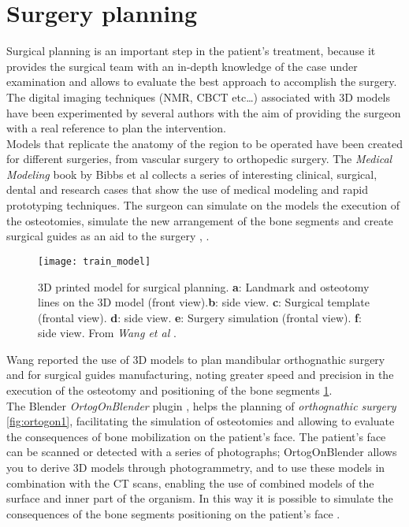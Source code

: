 \section{Surgery planning}
Surgical planning is an important step in the patient's treatment, because it provides the surgical team with an in-depth knowledge of the case under examination and allows to evaluate the best approach to accomplish the surgery. The digital imaging techniques (NMR, CBCT etc\ldots) associated with 3D models have been experimented by several authors with the aim of providing the surgeon with a real reference to plan the intervention. \\ Models that replicate the anatomy of the region to be operated have been created for different surgeries, from vascular surgery to orthopedic surgery. The \emph{Medical Modeling} book by Bibbs et al \parencite{Reference1} collects a series of interesting clinical, surgical, dental and research cases that show the use of medical modeling and rapid prototyping techniques. The surgeon can simulate on the models the execution of the osteotomies, simulate the new arrangement of the bone segments and create surgical guides as an aid to the surgery \parencite{Reference77}, \parencite{Reference78}.
\begin{figure}[h]
\vspace{-10pt}
	\begin{center}
	\texttt{[image: train\_model]}
    \caption{3D printed model for surgical planning.
\textbf{a}: Landmark and osteotomy lines on the 3D model (front view).\textbf{b}: side view. \textbf{c}: Surgical template (frontal view). \textbf{d}: side view. \textbf{e}: Surgery simulation (frontal view). \textbf{f}: side view. From \emph{Wang et al} \parencite{Reference20}.}
    \label{fig:train_model}
    \end{center}
\vspace{-20pt}
\end{figure}

Wang \parencite{Reference109} reported the use of 3D models to plan mandibular orthognathic surgery and for surgical guides manufacturing, noting greater speed and precision in the execution of the osteotomy and positioning of the bone segments \ref{fig:train_model}. \\
The Blender \emph{OrtogOnBlender} plugin \parencite{Reference64}, \parencite{Reference79} helps the planning of \emph{orthognathic surgery} \ref{fig:ortogon1}, facilitating the simulation of osteotomies and allowing to evaluate the consequences of bone mobilization on the patient's face. The patient's face can be scanned or detected with a series of photographs; OrtogOnBlender allows you to derive 3D models through photogrammetry, and to use these models in combination with the CT scans, enabling the use of combined models of the surface and inner part of the organism. In this way it is possible to simulate the consequences of the bone segments positioning on the patient's face  \parencite{Reference145}.


